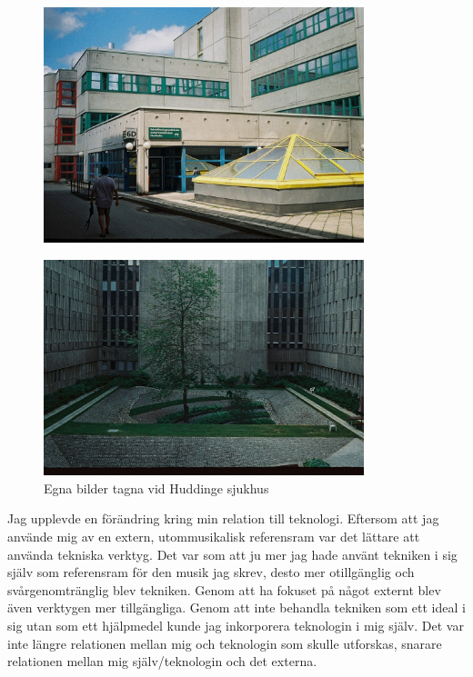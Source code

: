 \documentclass{article}
\begin{document}
\begin{figure}
	\centering
	\includegraphics[keepaspectratio, width=0.83\textwidth]{innergaard2} \\

	\vspace*{-0.3mm}

	\includegraphics[keepaspectratio, width=0.83\textwidth]{innergaard1}
	\caption{Egna bilder tagna vid Huddinge sjukhus}
\end{figure}


Jag upplevde en förändring kring min relation till teknologi. Eftersom att jag använde mig av en extern,
utommusikalisk referensram var det lättare att använda tekniska verktyg. Det var som att ju mer jag hade
använt tekniken i sig själv som referensram för den musik jag skrev, desto mer otillgänglig och
svårgenomtränglig blev tekniken. Genom att ha fokuset på något externt blev även verktygen mer tillgängliga.
Genom att inte behandla tekniken som ett ideal i sig utan som ett hjälpmedel kunde jag inkorporera teknologin
i mig själv. Det var inte längre relationen mellan mig och teknologin som skulle utforskas, snarare relationen
mellan mig själv/teknologin och det externa.
\end{document}
